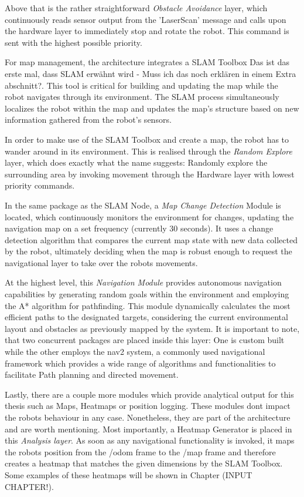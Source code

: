 \documentclass[]{article}
\begin{document}
	Above that is the rather straightforward \textit{Obstacle Avoidance} layer, which continuously reads sensor output from the 'LaserScan' message \autocite{ros.orgLaserScanMessage2024a} and calls upon the hardware layer to immediately stop and rotate the robot. This command is sent with the highest possible priority. 
	
	For map management, the architecture integrates a SLAM Toolbox {\color{red} Das ist das erste mal, dass SLAM erwähnt wird - Muss ich das noch erklären in einem Extra abschnitt?}. This tool is critical for building and updating the map while the robot navigates through its environment. The SLAM process simultaneously localizes the robot within the map and updates the map's structure based on new information gathered from the robot's sensors.
	
	In order to make use of the SLAM Toolbox and create a map, the robot has to wander around in its environment. This is realised through the \textit{Random Explore} layer, which does exactly what the name suggests: Randomly explore the surrounding area by invoking movement through the Hardware layer with lowest priority commands. 
	
	In the same package as the SLAM Node, a \textit{Map Change Detection} Module is located, which continuously monitors the environment for changes, updating the navigation map on a set frequency (currently 30 seconds). It uses a change detection algorithm that compares the current map state with new data collected by the robot, ultimately deciding when the map is robust enough to request the navigational layer to take over the robots movements. 
	
	At the highest level, this \textit{Navigation Module} provides autonomous navigation capabilities by generating random goals within the environment and employing the A* algorithm for pathfinding. This module dynamically calculates the most efficient paths to the designated targets, considering the current environmental layout and obstacles as previously mapped by the system. It is important to note, that two concurrent packages are placed inside this layer: One is custom built while the other employs the nav2 system, a commonly used navigational framework which provides a wide range of algorithms and functionalities to facilitate Path planning and directed movement. \autocite{macenskiMarathonNavigationSystem2020}
	
	Lastly, there are a couple more modules which provide analytical output for this thesis such as Maps, Heatmaps or position logging. These modules dont impact the robots behaviour in any case. Nonetheless, they are part of the architecture and are worth mentioning. Most importantly, a Heatmap Generator is placed in this \textit{Analysis layer}. As soon as any navigational functionality is invoked, it maps the robots position from the /odom frame to the /map frame and therefore creates a heatmap that matches the given dimensions by the SLAM Toolbox. Some examples of these heatmaps will be shown in Chapter (INPUT CHAPTER!).
	
\end{document}
